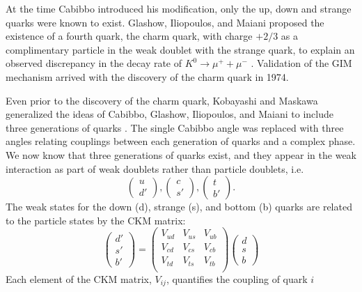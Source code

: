 At the time Cabibbo introduced his modification, only the up, down and strange quarks were known
to exist. Glashow, Iliopoulos, and Maiani proposed the existence of a fourth quark, the charm quark,
with charge $+2/3$ as a complimentary particle in the weak doublet with the strange quark, to explain
an observed discrepancy in the decay rate of $K^0 \rightarrow \mu^+ + \mu^-$ \cite{glashow1970}.
Validation of the GIM mechanism arrived with the discovery of the
charm quark in 1974.

Even prior to the discovery of the charm quark, Kobayashi and Maskawa generalized the ideas of
Cabibbo, Glashow, Iliopoulos, and Maiani to include three generations of quarks \cite{kobayashi1973}. The single
Cabibbo angle was replaced with three angles relating couplings between each generation of quarks and a complex
phase. We now know that three generations of quarks exist, and they appear in the weak interaction as part of weak
doublets rather than particle doublets, i.e.
%
\begin{equation}
  \begin{pmatrix} u \\ d' \end{pmatrix} ,
  \begin{pmatrix} c \\ s' \end{pmatrix} ,
  \begin{pmatrix} t \\ b' \end{pmatrix}.
\end{equation}
%
The weak states for the down (d), strange (s), and bottom (b) quarks are related to the particle states
by the CKM matrix: 
%
\begin{equation}
  \begin{pmatrix} d' \\s' \\ b' \end{pmatrix} =
  \begin{pmatrix} V_{ud} & V_{us} & V_{ub} \\
    V_{cd} & V_{cs} & V_{cb} \\
    V_{td} & V_{ts} & V_{tb} \\
  \end{pmatrix}
  \begin{pmatrix} d \\s \\ b \end{pmatrix}
\end{equation}
%
Each element of the CKM matrix, $V_{ij}$, quantifies the coupling of quark $i$
